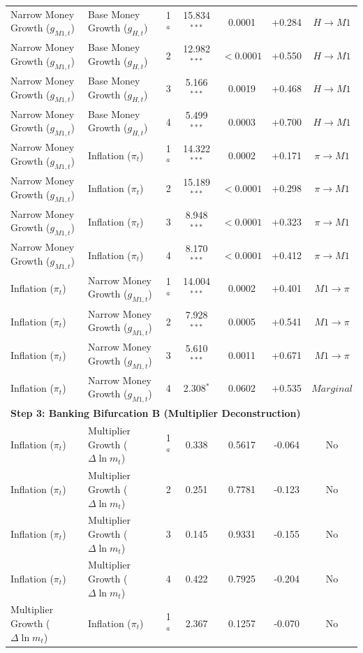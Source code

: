 \begin{table}[p]
{\begin{tabular}{llccccc}
Narrow Money Growth ($g_{M1,t}$) & Base Money Growth ($g_{H,t}$) & 1$^a$ & 15.834$^{***}$ & 0.0001 & +0.284 & $H \to M1$ \\
Narrow Money Growth ($g_{M1,t}$) & Base Money Growth ($g_{H,t}$) & 2 & 12.982$^{***}$ & $< 0.0001$ & +0.550 & $H \to M1$ \\
Narrow Money Growth ($g_{M1,t}$) & Base Money Growth ($g_{H,t}$) & 3 & 5.166$^{***}$ & 0.0019 & +0.468 & $H \to M1$ \\
Narrow Money Growth ($g_{M1,t}$) & Base Money Growth ($g_{H,t}$) & 4 & 5.499$^{***}$ & 0.0003 & +0.700 & $H \to M1$ \\
Narrow Money Growth ($g_{M1,t}$) & Inflation ($\pi_t$) & 1$^a$ & 14.322$^{***}$ & 0.0002 & +0.171 & $\pi \to M1$ \\
Narrow Money Growth ($g_{M1,t}$) & Inflation ($\pi_t$) & 2 & 15.189$^{***}$ & $< 0.0001$ & +0.298 & $\pi \to M1$ \\
Narrow Money Growth ($g_{M1,t}$) & Inflation ($\pi_t$) & 3 & 8.948$^{***}$ & $< 0.0001$ & +0.323 & $\pi \to M1$ \\
Narrow Money Growth ($g_{M1,t}$) & Inflation ($\pi_t$) & 4 & 8.170$^{***}$ & $< 0.0001$ & +0.412 & $\pi \to M1$ \\
Inflation ($\pi_t$) & Narrow Money Growth ($g_{M1,t}$) & 1$^a$ & 14.004$^{***}$ & 0.0002 & +0.401 & $M1 \to \pi$ \\
Inflation ($\pi_t$) & Narrow Money Growth ($g_{M1,t}$) & 2 & 7.928$^{***}$ & 0.0005 & +0.541 & $M1 \to \pi$ \\
Inflation ($\pi_t$) & Narrow Money Growth ($g_{M1,t}$) & 3 & 5.610$^{***}$ & 0.0011 & +0.671 & $M1 \to \pi$ \\
Inflation ($\pi_t$) & Narrow Money Growth ($g_{M1,t}$) & 4 & 2.308$^{*}$ & 0.0602 & +0.535 & $Marginal$ \\
\multicolumn{7}{l}{\textbf{Step 3: Banking Bifurcation B (Multiplier Deconstruction)}} \\[0.15em]
Inflation ($\pi_t$) & Multiplier Growth ($\Delta \ln m_t$) & 1$^a$ & 0.338 & 0.5617 & -0.064 & No \\
Inflation ($\pi_t$) & Multiplier Growth ($\Delta \ln m_t$) & 2 & 0.251 & 0.7781 & -0.123 & No \\
Inflation ($\pi_t$) & Multiplier Growth ($\Delta \ln m_t$) & 3 & 0.145 & 0.9331 & -0.155 & No \\
Inflation ($\pi_t$) & Multiplier Growth ($\Delta \ln m_t$) & 4 & 0.422 & 0.7925 & -0.204 & No \\
Multiplier Growth ($\Delta \ln m_t$) & Inflation ($\pi_t$) & 1$^a$ & 2.367 & 0.1257 & -0.070 & No \\

\end{tabular}}
\end{table}
